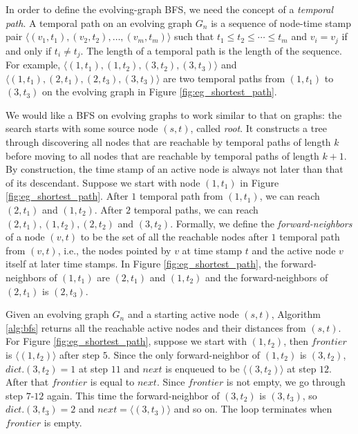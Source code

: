 \documentclass[11pt,conference,compsocconf]{IEEEtran}
\theoremstyle{definition}
\begin{document}
In order to define the evolving-graph BFS, we need the concept of a
\emph{temporal path}.
A temporal path on an evolving graph $G_n$ is a sequence of node-time stamp
pair $\langle (v_1, t_1), (v_2, t_2), \ldots, (v_m, t_m) \rangle$ such that
$t_1 \leq t_2 \leq \cdots \leq t_m$ and $v_i = v_j$ if and only if
$t_i \ne t_j$. The length of a temporal path is the length of the sequence.
For example, $\langle (1, t_1), (1, t_2), (3, t_2), (3, t_3) \rangle$ and
$\langle (1, t_1), (2, t_1), (2, t_3), (3, t_3) \rangle$
are two temporal paths from $(1, t_1)$ to $(3, t_3)$
on the evolving graph in Figure \ref{fig:eg_shortest_path}.

We would like a BFS on evolving graphs to work similar to that on graphs: the search starts with some source node $(s,t)$, called \emph{root}. It constructs a tree through discovering all nodes that are reachable by
temporal paths of length $k$ before moving to all nodes that are reachable by
 temporal paths of length $k+1$.
By construction, the time stamp of an active node is always not later than
that of its descendant. Suppose we
start with node $(1, t_1)$ in Figure \ref{fig:eg_shortest_path}.
After $1$ temporal path from $(1, t_1)$, we can reach
$(2, t_1)$ and $(1, t_2)$. After $2$ temporal paths, we can reach
$(2, t_1), (1, t_2), (2, t_2)$ and $(3, t_2)$.
Formally, we define the \emph{forward-neighbors} of a node $(v, t)$ to
be the set of all the reachable nodes after $1$ temporal path from
$(v, t)$, i.e., the nodes pointed by $v$ at time stamp $t$ and
the active node $v$ itself at later time stamps. In Figure
\ref{fig:eg_shortest_path},
the forward-neighbors of $(1, t_1)$  are $(2, t_1)$ and $(1, t_2)$ and
the forward-neighbors of $(2, t_1)$ is $(2, t_3)$.

Given an evolving graph $G_n$ and a starting active node $(s,t)$, Algorithm \ref{alg:bfs} 
returns all the reachable active nodes and their distances from $(s,t)$. 
For Figure \ref{fig:eg_shortest_path}, suppose we start with $(1, t_2)$, then
$frontier$ is $\langle(1,t_2)\rangle$ after step $5$.  Since the only forward-neighbor of 
$(1,t_2)$ is $(3,t_2)$, $dict.(3,t_2) =1$ at step $11$ and $next$ is enqueued to be 
$\langle (3,t_2) \rangle$ at step $12$. After that $frontier$ is equal to $next$. Since 
$frontier$ is not empty, we go through step $7$-$12$ again. This time 
the forward-neighbor of $(3,t_2)$ is $(3,t_3)$, so $dict.(3,t_3)=2$ and 
$next = \langle (3,t_3) \rangle$ and so on. The loop terminates when $frontier$ is empty.
\end{document}
